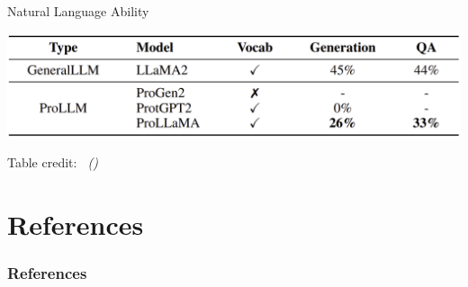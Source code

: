\documentclass[dvipsnames,
hyperref={colorlinks,citecolor=black}
]{beamer}
\newcommand{\credit}[2]{\par\hfill \tiny #1 credit:~\itshape\citeauthor{#2} (\citeyear{#2})}
\begin{document}
\begin{frame}{Natural Language Ability}
	\begin{center}
		\includegraphics[scale=0.21]{tables/natural_language_ability_comparison.png}
	\end{center}
	\credit{Table}{lv2024prollama}
\end{frame}

\section{References}
\begin{frame}[allowframebreaks]
\frametitle{References}
\printbibliography
\end{frame}
\end{document}
